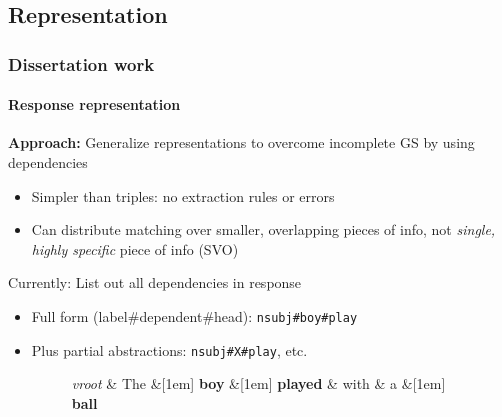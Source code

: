\documentclass{beamer}
\begin{document}
\subsection{Representation}
\begin{frame}
\frametitle{Dissertation work}
\framesubtitle{Response representation}


\textbf{Approach:} Generalize representations to overcome incomplete
GS by using dependencies

\begin{itemize}
\item Simpler than triples: no extraction rules or errors
\item Can distribute matching over smaller, overlapping pieces of info, not \textit{single, highly specific} piece of info (SVO)
\end{itemize}

\smallskip

Currently: List out all dependencies in response
\begin{itemize}
\item Full form (label\#dependent\#head): \texttt{nsubj\#boy\#play}
\item Plus partial abstractions: \texttt{nsubj\#X\#play}, etc.
\begin{figure}
\begin{center}
    \begin{dependency}[arc edge,text only label,label style={above}]
    \begin{deptext}[column sep=.5em]
      \textit{vroot} \& The \&[1em] \textbf{boy} \&[1em] \textbf{played} \& with \& a \&[1em] \textbf{ball} \\
    \end{deptext}
  \end{dependency}
\end{center}
\label{fig:prep-dependency}
\end{figure}
\end{itemize}
%

\end{frame}
\end{document}
